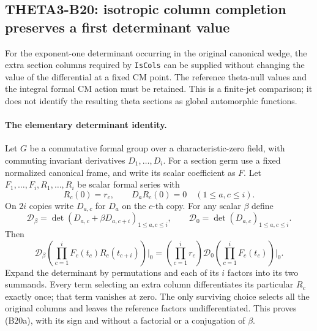 \subsection{THETA3-B20: isotropic column completion preserves a first determinant value}\label{B20}

For the exponent-one determinant occurring in the original
canonical wedge, the extra section columns required by
\texttt{IsCols} can be supplied without changing the value of
the differential at a fixed CM point.  The reference theta-null
values and the integral formal CM action must be retained.
This is a finite-jet comparison; it does not identify the
resulting theta sections as global automorphic functions.

\paragraph{The elementary determinant identity.}
Let $G$ be a commutative formal group over a characteristic-zero
field, with commuting invariant derivatives $D_1,\ldots,D_i$.
For a section germ use a fixed normalized canonical frame, and
write its scalar coefficient as $F$.
Let $F_1,\ldots,F_i,R_1,\ldots,R_i$ be scalar formal series with
\[
                  R_c(0)=r_c,\qquad D_aR_c(0)=0
                     \quad(1\leq a,c\leq i).
\]
On $2i$ copies write $D_{a,c}$ for $D_a$ on the $c$-th copy.
For any scalar $\beta$ define
\[
 \mathcal D_\beta=
     \det(D_{a,c}+\beta D_{a,c+i})_{1\leq a,c\leq i},
 \qquad
 \mathcal D_0=\det(D_{a,c})_{1\leq a,c\leq i}.
\]
Then
\begin{equation}\label{B20-value}
 \mathcal D_\beta
       \left(\prod_{c=1}^iF_c(t_c)R_c(t_{c+i})\right)\Big|_0
     =\left(\prod_{c=1}^ir_c\right)
          \mathcal D_0\left(\prod_{c=1}^iF_c(t_c)\right)\Big|_0.
 \tag{B20a}
\end{equation}
Expand the determinant by permutations and each of its $i$
factors into its two summands.  Every term selecting an extra
column differentiates its particular $R_c$ exactly once;
that term vanishes at zero.  The only surviving choice selects
all the original columns and leaves the reference factors
undifferentiated.  This proves (B20a), with its sign and without
a factorial or a conjugation of $\beta$.

